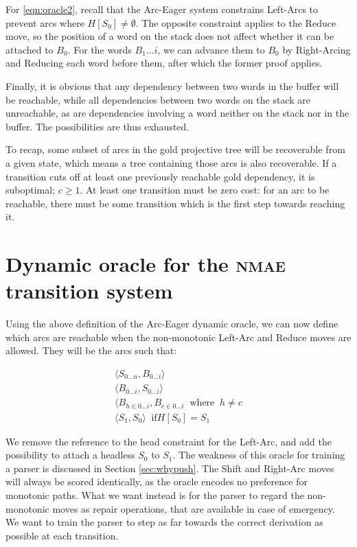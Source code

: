\documentclass[11pt,letterpaper]{article}
\begin{document}
For \ref{eqn:oracle2}, recall that the Arc-Eager system constrains
Left-Arcs to prevent arcs where $H[S_0] \neq \emptyset$. The opposite constraint
applies to the Reduce move, so the position of a word on the stack does not
affect whether it can be attached to $B_0$. For the words $B_1...i$, we can
advance them to $B_0$ by Right-Arcing and Reducing each word before them,
after which the former proof applies.

Finally, it is obvious that any dependency between two words in the buffer will
be reachable, while all dependencies between two words on the stack are unreachable,
as are dependencies involving a word neither on the stack nor in the buffer. The
possibilities are thus exhausted.

To recap, some subset of arcs in the gold projective tree will be recoverable
from a given state, which means a tree containing those arcs is also recoverable.
If a transition cuts off at least one previously reachable gold dependency, it is
suboptimal; $c \ge 1$.
At least one transition must be zero cost: for an arc to be reachable, there
must be some transition which is the first step towards reaching it.

\section{Dynamic oracle for the \textsc{nmae} transition system}

Using the above definition of the Arc-Eager dynamic oracle, we can now
define which arcs are reachable when the non-monotonic Left-Arc and Reduce moves
are allowed. They will be the arcs such that:

\begin{eqnarray}
    \langle S_{0...n}, B_{0...i}\rangle \label{eqn:nmo1} \\
    \langle B_{0...i}, S_{0...i} \rangle \label{eqn:nmo2} \\
    \langle B_{h \in {0...i}}, B_{c \in {0...i}}\;\; \mbox{where}\;\; h \neq c\\
    \langle S_1, S_0 \rangle \;\; \mbox{if} H[S_0] = S_1
\end{eqnarray}

We remove the reference to the head constraint for the Left-Arc, and add the
possibility to attach a headless $S_0$ to $S_1$. The weakness of this oracle
for training a parser is discussed in Section \ref{sec:whypush}. The Shift and
Right-Arc moves will always be scored identically, as the oracle encodes no
preference for monotonic paths. What we want instead is for the parser to regard
the non-monotonic moves as repair operations, that are available in case of
emergency. We want to train the parser to step as far towards the correct derivation
as possible at each transition.
\end{document}
